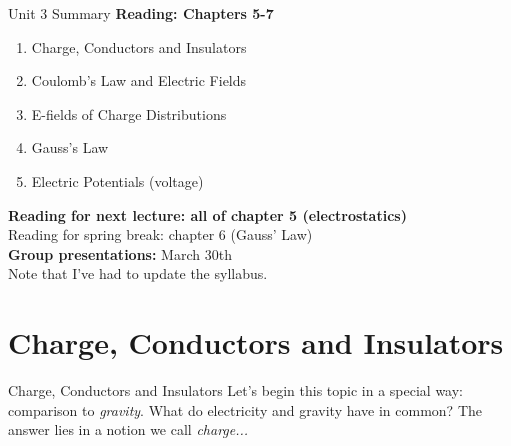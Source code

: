 \documentclass{beamer}
\begin{document}
\begin{frame}{Unit 3 Summary}
\textbf{Reading: Chapters 5-7}
\begin{enumerate}
\item Charge, Conductors and Insulators
\item Coulomb's Law and Electric Fields
\item E-fields of Charge Distributions
\item Gauss's Law
\item Electric Potentials (voltage)
\end{enumerate}
\textbf{Reading for next lecture: all of chapter 5 (electrostatics)} \\ 
\alert{Reading for spring break: chapter 6 (Gauss' Law)} \\
\alert{\textbf{Group presentations:} March 30th} \\
Note that I've had to update the syllabus.
\end{frame}

\section{Charge, Conductors and Insulators}

\begin{frame}{Charge, Conductors and Insulators}
Let's begin this topic in a special way: comparison to \textit{gravity}.  What do electricity and gravity have in common?  The answer lies in a notion we call \textit{charge...}
\end{frame}
\end{document}
